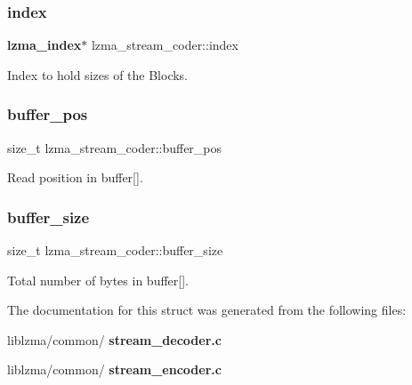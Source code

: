 \subsubsection{index}
{\footnotesize\ttfamily \textbf{ lzma\+\_\+index}$\ast$ lzma\+\_\+stream\+\_\+coder\+::index}



Index to hold sizes of the Blocks. 

\mbox{\label{structlzma__stream__coder_a5a95aaa98afb6f35b83a7175bbc3212f}} 
\subsubsection{buffer\+\_\+pos}
{\footnotesize\ttfamily size\+\_\+t lzma\+\_\+stream\+\_\+coder\+::buffer\+\_\+pos}



Read position in buffer[]. 

\mbox{\label{structlzma__stream__coder_accef680b4554c3e62bcbbd5584c8fb64}} 
\subsubsection{buffer\+\_\+size}
{\footnotesize\ttfamily size\+\_\+t lzma\+\_\+stream\+\_\+coder\+::buffer\+\_\+size}



Total number of bytes in buffer[]. 



The documentation for this struct was generated from the following files\+:\begin{DoxyCompactItemize}
\item 
liblzma/common/\textbf{ stream\+\_\+decoder.\+c}\item 
liblzma/common/\textbf{ stream\+\_\+encoder.\+c}\end{DoxyCompactItemize}
